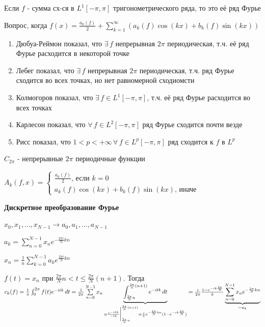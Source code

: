 \begin{remark}
    Если $f$ - сумма сх-ся в $L^1 [-\pi, \pi]$ тригонометрического ряда, то это её ряд Фурье

    Вопрос, когда $f (x) = \frac{a_0 (f)}{2} + \sum_{k = 1}^\infty (a_k (f) \cos (kx) + b_k (f) \sin (kx))$

    \begin{enumerate}
        \item {
            Дюбуа-Реймон показал, что $\exists \, f$ непрерывная $2\pi$ периодическая, т.ч. её ряд Фурье расходится в некоторой точке
        }
        \item {
            Лебег показал, что $\exists \, f$ непрерывная $2\pi$ периодическая, т.ч. ряд Фурье сходится во всех точках, но нет равномерной сходиомсти
        }
        \item {
            Колмогоров показал, что $\exists \, f \in L^1 [-\pi, \pi]$, т.ч. её ряд Фурье расходится во всех точках
        }
        \item {
            Карлесон показал, что $\forall \, f \in L^2 [-\pi, \pi]$ ряд Фурье сходится почти везде
        }
        \item {
            Рисс показал, что $1 < p < +\infty \, \forall \, f \in L^p [-\pi, \pi]$ ряд сходится к $f$ в $L^p$
        }
    \end{enumerate}

    $C_{2\pi}$ - непрерывные $2\pi$ периодичные функции

    $A_k (f, x) = \begin{cases}
        \frac{a_0(f)}{2} \text{, если $k = 0$} \\
        a_k (f) \cos (kx) + b_k (f) \sin (kx) \text{, иначе}
    \end{cases}$
\end{remark}

\textbf{Дискретное преобразование Фурье}

$x_0, x_1, \ldots, x_{N - 1} \rightarrow a_0, a_1, \ldots, a_{N - 1}$

$a_k = \sum\limits_{n = 0}^{N - 1} x_n e^{-\frac{2\pi i}{N} kn}$

$x_n = \frac{1}{n} \sum\limits_{k = 0}^{N - 1} a_k e^{\frac{2\pi i}{N} kn}$


$f(t) = x_n$ при $\frac{2\pi}{N}n < t \leqslant \frac{2\pi}{N} (n + 1)$. Тогда $c_k (f) = \frac{1}{\pi} \int_0^{2\pi} f(t) e^{-itk}\, dt = \\
\frac{1}{2\pi} \sum\limits_{n = 0}^{N - 1} x_n \underbrace{\int_{\frac{2\pi}{N} n}^{\frac{2\pi}{n} (n + 1)} e^{-itk} \, dt}_{=\frac{e^{-itk}}{-ik} \bigg |_{\frac{2\pi}{n} n}^{\frac{2\pi}{n} (n + 1)} = \frac{i}{k} e^{-\frac{2\pi}{N}kn} (1 - e^{-ik\frac{2\pi}{N}})} = 
\frac{i}{2\pi} \frac{1 - e^{-ik\frac{2\pi}{N}}}{k} \underbrace{\sum_{n = 0}^{N - 1} x_n e^{-\frac{2\pi}{N} kn}}_{= a_k}$ 

